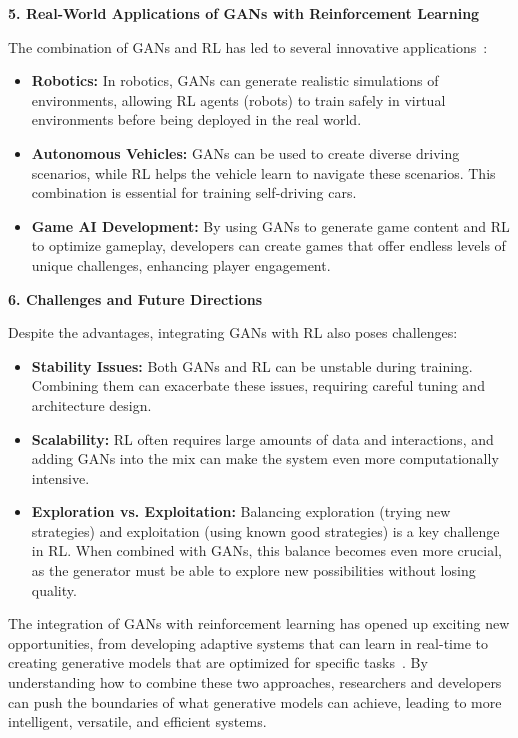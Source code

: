 \textbf{5. Real-World Applications of GANs with Reinforcement Learning}

The combination of GANs and RL has led to several innovative applications~\cite{scholl2011challenges}:
\begin{itemize}
    \item \textbf{Robotics:} In robotics, GANs can generate realistic simulations of environments, allowing RL agents (robots) to train safely in virtual environments before being deployed in the real world.
    \item \textbf{Autonomous Vehicles:} GANs can be used to create diverse driving scenarios, while RL helps the vehicle learn to navigate these scenarios. This combination is essential for training self-driving cars.
    \item \textbf{Game AI Development:} By using GANs to generate game content and RL to optimize gameplay, developers can create games that offer endless levels of unique challenges, enhancing player engagement.
\end{itemize}

\textbf{6. Challenges and Future Directions}

Despite the advantages, integrating GANs with RL also poses challenges:
\begin{itemize}
    \item \textbf{Stability Issues:} Both GANs and RL can be unstable during training. Combining them can exacerbate these issues, requiring careful tuning and architecture design.
    \item \textbf{Scalability:} RL often requires large amounts of data and interactions, and adding GANs into the mix can make the system even more computationally intensive.
    \item \textbf{Exploration vs. Exploitation:} Balancing exploration (trying new strategies) and exploitation (using known good strategies) is a key challenge in RL. When combined with GANs, this balance becomes even more crucial, as the generator must be able to explore new possibilities without losing quality.
\end{itemize}

The integration of GANs with reinforcement learning has opened up exciting new opportunities, from developing adaptive systems that can learn in real-time to creating generative models that are optimized for specific tasks~\cite{scholl2011challenges}. By understanding how to combine these two approaches, researchers and developers can push the boundaries of what generative models can achieve, leading to more intelligent, versatile, and efficient systems.


